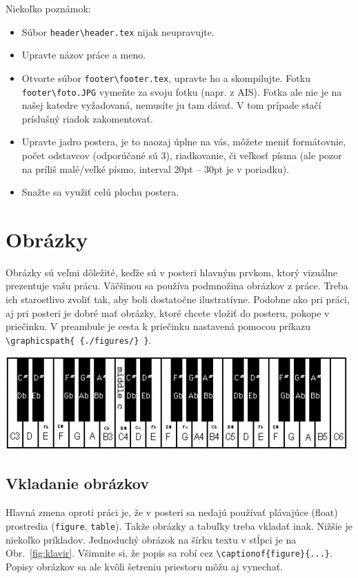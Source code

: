 \documentclass[portrait,a0]{a0poster}
\begin{document}
\begin{multicols}{3}
	Niekoľko poznámok:
	\begin{itemize}
		\item Súbor \verb|header\header.tex| nijak neupravujte.
		\item Upravte názov práce a meno.
		\item Otvorte súbor \verb|footer\footer.tex|, upravte ho a skompilujte. Fotku \verb|footer\foto.JPG| vymeňte za svoju fotku (napr. z AIS). Fotka ale nie je na našej katedre vyžadovaná, nemusíte ju tam dávať. V tom prípade stačí príslušný riadok zakomentovať.
		\item Upravte jadro postera, je to naozaj úplne na vás, môžete meniť formátovnie, počet odstavcov (odporúčané sú 3), riadkovanie, či veľkosť písma (ale pozor na príliš malé/veľké písmo, interval 20pt -- 30pt je v poriadku).
		\item Snažte sa využiť celú plochu postera.
	\end{itemize}
	
	\section*{Obrázky}
	Obrázky sú veľmi dôležité, keďže sú v posteri hlavným prvkom, ktorý vizuálne prezentuje vašu prácu. Väčšinou sa používa podmnožina obrázkov z práce. Treba ich starostlivo zvoliť tak, aby boli dostatočne ilustratívne. Podobne ako pri práci, aj pri posteri je dobré mať obrázky, ktoré chcete vložiť do posteru, pokope v priečinku. V preambule je cesta k priečinku nastavená pomocou príkazu 
	\verb|\graphicspath{ {./figures/} }|.
	
	\begin{center}
		\includegraphics[width=\linewidth]{klavir2}
		\label{fig:klavir}
	\end{center}
	
	\subsection*{Vkladanie obrázkov}
	
	Hlavná zmena oproti práci je, že v posteri sa nedajú používať plávajúce (float) prostredia (\verb|figure|, \verb|table|). Takže obrázky a tabuľky treba vkladať inak. Nižšie je niekoľko príkladov. Jednoduchý obrázok na šírku textu v stĺpci je na Obr.~\ref{fig:klavir}. Všimnite si, že popis sa robí cez \verb|\captionof{figure}{...}|. Popisy obrázkov sa ale kvôli šetreniu priestoru môžu aj vynechať.
	

\end{multicols}
\end{document}
